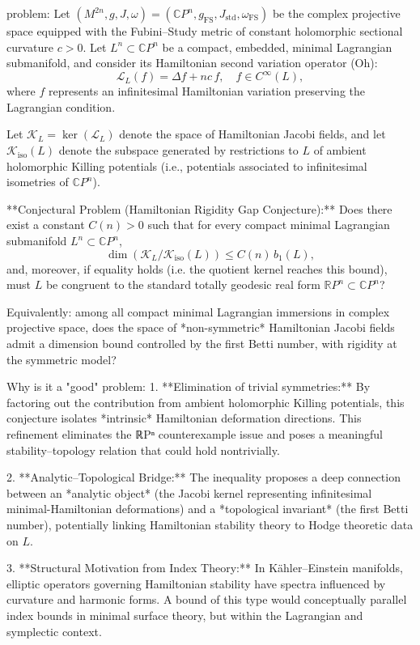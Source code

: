 problem:  
Let \( (M^{2n}, g, J, \omega) = (\mathbb{C}P^n, g_{\text{FS}}, J_{\text{std}}, \omega_{\text{FS}}) \) be the complex projective space equipped with the Fubini–Study metric of constant holomorphic sectional curvature \(c>0\).  
Let \(L^n \subset \mathbb{C}P^n\) be a compact, embedded, minimal Lagrangian submanifold, and consider its Hamiltonian second variation operator (Oh):
\[
\mathcal{L}_L(f) = \Delta f + n c\, f, \quad f \in C^\infty(L),
\]
where \(f\) represents an infinitesimal Hamiltonian variation preserving the Lagrangian condition.

Let \(\mathcal{K}_L = \ker(\mathcal{L}_L)\) denote the space of Hamiltonian Jacobi fields, and let \(\mathcal{K}_{\text{iso}}(L)\) denote the subspace generated by restrictions to \(L\) of ambient holomorphic Killing potentials (i.e., potentials associated to infinitesimal isometries of \(\mathbb{C}P^n\)).

**Conjectural Problem (Hamiltonian Rigidity Gap Conjecture):**  
Does there exist a constant \(C(n)>0\) such that for every compact minimal Lagrangian submanifold \(L^n \subset \mathbb{C}P^n\),
\[
\dim(\mathcal{K}_L / \mathcal{K}_{\text{iso}}(L)) \le C(n)\, b_1(L),
\]
and, moreover, if equality holds (i.e. the quotient kernel reaches this bound), must \(L\) be congruent to the standard totally geodesic real form \( \mathbb{R}P^n \subset \mathbb{C}P^n \)?

Equivalently: among all compact minimal Lagrangian immersions in complex projective space, does the space of *non-symmetric* Hamiltonian Jacobi fields admit a dimension bound controlled by the first Betti number, with rigidity at the symmetric model?

Why is it a "good" problem:  
1. **Elimination of trivial symmetries:**  
   By factoring out the contribution from ambient holomorphic Killing potentials, this conjecture isolates *intrinsic* Hamiltonian deformation directions. This refinement eliminates the ℝPⁿ counterexample issue and poses a meaningful stability–topology relation that could hold nontrivially.

2. **Analytic–Topological Bridge:**  
   The inequality proposes a deep connection between an *analytic object* (the Jacobi kernel representing infinitesimal minimal-Hamiltonian deformations) and a *topological invariant* (the first Betti number), potentially linking Hamiltonian stability theory to Hodge theoretic data on \(L\).

3. **Structural Motivation from Index Theory:**  
   In Kähler–Einstein manifolds, elliptic operators governing Hamiltonian stability have spectra influenced by curvature and harmonic forms. A bound of this type would conceptually parallel index bounds in minimal surface theory, but within the Lagrangian and symplectic context.

